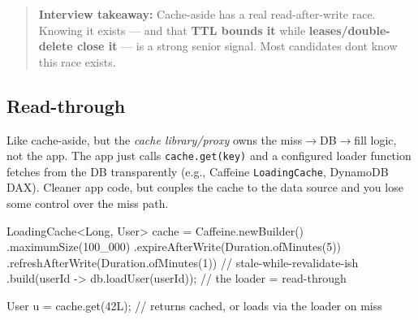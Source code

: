 \documentclass[11pt]{article}
\newenvironment{Shaded}{\begin{snugshade}}{\end{snugshade}}
\newcommand{\BuiltInTok}[1]{\textcolor[rgb]{0.50,0.55,0.55}{#1}}
\newcommand{\CommentTok}[1]{\textcolor[rgb]{0.48,0.49,0.49}{#1}}
\newcommand{\DecValTok}[1]{\textcolor[rgb]{0.96,0.45,0.00}{#1}}
\newcommand{\FunctionTok}[1]{\textcolor[rgb]{0.56,0.27,0.68}{#1}}
\newcommand{\NormalTok}[1]{\textcolor[rgb]{0.81,0.81,0.76}{#1}}
\newcommand{\OperatorTok}[1]{\textcolor[rgb]{0.81,0.81,0.76}{#1}}
\begin{document}
\begin{quote}
\textbf{Interview takeaway:} Cache-aside has a real read-after-write race. Knowing it exists --- and that \textbf{TTL bounds it} while \textbf{leases/double-delete close it} --- is a strong senior signal. Most candidates don\textquotesingle t know this race exists.
\end{quote}

\subsection{Read-through}\label{read-through}

Like cache-aside, but the \emph{cache library/proxy} owns the miss\(\rightarrow\)DB\(\rightarrow\)fill logic, not the app. The app just calls \texttt{cache.get(key)} and a configured loader function fetches from the DB transparently (e.g., Caffeine \texttt{LoadingCache}, DynamoDB DAX). Cleaner app code, but couples the cache to the data source and you lose some control over the miss path.


\begin{Shaded}
\begin{Highlighting}[]
\NormalTok{LoadingCache}\OperatorTok{\textless{}}\BuiltInTok{Long}\OperatorTok{,}\NormalTok{ User}\OperatorTok{\textgreater{}}\NormalTok{ cache }\OperatorTok{=}\NormalTok{ Caffeine}\OperatorTok{.}\FunctionTok{newBuilder}\OperatorTok{()}
    \OperatorTok{.}\FunctionTok{maximumSize}\OperatorTok{(}\DecValTok{100\_000}\OperatorTok{)}
    \OperatorTok{.}\FunctionTok{expireAfterWrite}\OperatorTok{(}\BuiltInTok{Duration}\OperatorTok{.}\FunctionTok{ofMinutes}\OperatorTok{(}\DecValTok{5}\OperatorTok{))}
    \OperatorTok{.}\FunctionTok{refreshAfterWrite}\OperatorTok{(}\BuiltInTok{Duration}\OperatorTok{.}\FunctionTok{ofMinutes}\OperatorTok{(}\DecValTok{1}\OperatorTok{))}   \CommentTok{// stale{-}while{-}revalidate{-}ish}
    \OperatorTok{.}\FunctionTok{build}\OperatorTok{(}\NormalTok{userId }\OperatorTok{{-}\textgreater{}}\NormalTok{ db}\OperatorTok{.}\FunctionTok{loadUser}\OperatorTok{(}\NormalTok{userId}\OperatorTok{));}        \CommentTok{// the loader = read{-}through}

\NormalTok{User u }\OperatorTok{=}\NormalTok{ cache}\OperatorTok{.}\FunctionTok{get}\OperatorTok{(}\DecValTok{42L}\OperatorTok{);}  \CommentTok{// returns cached, or loads via the loader on miss}
\end{Highlighting}
\end{Shaded}
\end{document}
